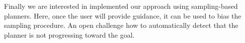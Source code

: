 \documentclass[conference]{IEEEtran}
\begin{document}
Finally we are interested in implemented our approach using sampling-based planners. Here, once the user will provide guidance, it can be used to bias the sampling procedure. 
An open challenge how to automatically detect that the planner is not progressing toward the goal.



%


\end{document}
